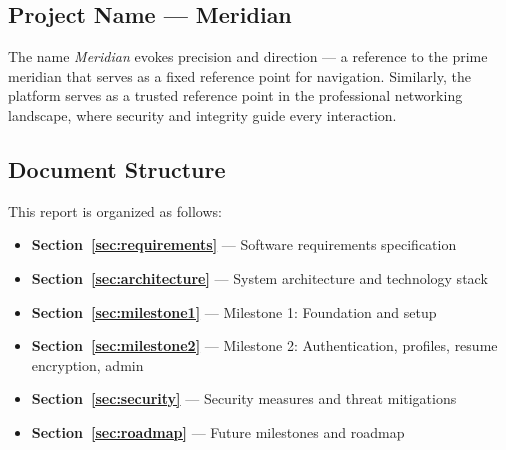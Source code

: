 \subsection{Project Name — Meridian}

The name \textit{Meridian} evokes precision and direction — a reference to the prime meridian that serves as a fixed reference point for navigation. Similarly, the platform serves as a trusted reference point in the professional networking landscape, where security and integrity guide every interaction.

\subsection{Document Structure}

This report is organized as follows:
\begin{itemize}
    \item \textbf{Section~\ref{sec:requirements}} — Software requirements specification
    \item \textbf{Section~\ref{sec:architecture}} — System architecture and technology stack
    \item \textbf{Section~\ref{sec:milestone1}} — Milestone 1: Foundation and setup
    \item \textbf{Section~\ref{sec:milestone2}} — Milestone 2: Authentication, profiles, resume encryption, admin
    \item \textbf{Section~\ref{sec:security}} — Security measures and threat mitigations
    \item \textbf{Section~\ref{sec:roadmap}} — Future milestones and roadmap
\end{itemize}
